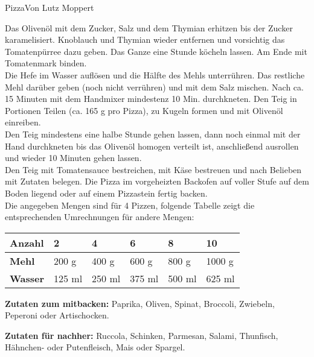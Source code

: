 \begin{recipe}{Pizza}{Von Lutz Moppert}
  \label{Pizza}


  \steps

  Das Olivenöl mit dem Zucker, Salz und dem Thymian erhitzen bis der Zucker
  karamelisiert. Knoblauch und Thymian wieder entfernen und vorsichtig das
  Tomatenpürree dazu geben. Das Ganze eine Stunde köcheln lassen. Am Ende mit
  Tomatenmark binden.\\

  Die Hefe im Wasser auflösen und die Hälfte des Mehls unterrühren. Das
  restliche Mehl darüber geben (noch nicht verrühren) und mit dem Salz mischen.
  Nach ca.  15 Minuten mit dem Handmixer mindestenz 10 Min. durchkneten. Den
  Teig in Portionen Teilen (ca. 165 g pro Pizza), zu Kugeln formen und mit Olivenöl 
  einreiben.\\

  Den Teig mindestens eine halbe Stunde gehen lassen, dann noch einmal mit der
  Hand durchkneten bis das Olivenöl homogen verteilt ist, anschließend
  ausrollen und wieder 10 Minuten gehen lassen.\\

  Den Teig mit Tomatensauce bestreichen, mit Käse bestreuen und nach Belieben
  mit Zutaten belegen. Die Pizza im vorgeheizten Backofen auf voller Stufe
  auf dem Boden liegend oder auf einem Pizzastein fertig backen.\\

  Die angegeben Mengen sind für 4 Pizzen, folgende Tabelle zeigt die
  entsprechenden Umrechnungen für andere Mengen:

  \begin{tabular}[h]{l|l|l|l|l|l}
    \textbf{Anzahl} & 2 & 4 & 6 & 8 & 10 \\
    \hline
    \textbf{Mehl} & 200 g & 400 g & 600 g & 800 g & 1000 g \\
    \hline
    \textbf{Wasser} & 125 ml & 250 ml & 375 ml & 500 ml & 625 ml \\
  \end{tabular}

  \textbf{Zutaten zum mitbacken:}
  Paprika, Oliven, Spinat, Broccoli, Zwiebeln, Peperoni oder Artischocken.

  \textbf{Zutaten für nachher:}
  Ruccola, Schinken, Parmesan, Salami, Thunfisch,   Hähnchen- oder
  Putenfleisch, Mais oder Spargel.

\end{recipe}
